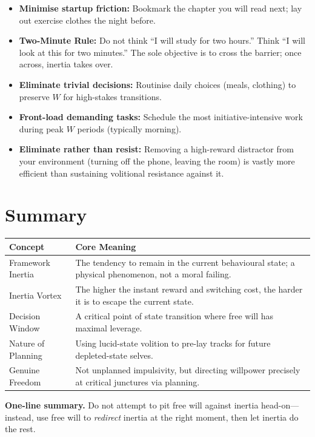 \begin{methodbox}[title={Method 2: Lower the Activation Barrier}]
\begin{itemize}[nosep]
  \item \textbf{Minimise startup friction:} Bookmark the chapter you will
        read next; lay out exercise clothes the night before.
  \item \textbf{Two-Minute Rule:} Do not think ``I will study for two
        hours.'' Think ``I will look at this for two minutes.'' The sole
        objective is to cross the barrier; once across, inertia takes over.
\end{itemize}
\end{methodbox}

\begin{methodbox}[title={Method 3: Conserve the Volitional Battery}]
\begin{itemize}[nosep]
  \item \textbf{Eliminate trivial decisions:} Routinise daily choices (meals,
        clothing) to preserve $W$ for high-stakes transitions.
  \item \textbf{Front-load demanding tasks:} Schedule the most
        initiative-intensive work during peak $W$ periods (typically morning).
  \item \textbf{Eliminate rather than resist:} Removing a high-reward
        distractor from your environment (turning off the phone, leaving the
        room) is vastly more efficient than sustaining volitional resistance
        against it.
\end{itemize}
\end{methodbox}

\section{Summary}\label{sec:summary}

\begin{center}
\renewcommand{\arraystretch}{1.4}
\begin{tabular}{@{}l p{}@{}}
\hline
\textbf{Concept} & \textbf{Core Meaning} \\
\hline
Framework Inertia &
  The tendency to remain in the current behavioural state; a physical
  phenomenon, not a moral failing. \\
Inertia Vortex &
  The higher the instant reward and switching cost, the harder it is to
  escape the current state. \\
Decision Window &
  A critical point of state transition where free will has maximal
  leverage. \\
Nature of Planning &
  Using lucid-state volition to pre-lay tracks for future depleted-state
  selves. \\
Genuine Freedom &
  Not unplanned impulsivity, but directing willpower precisely at critical
  junctures via planning. \\
\hline
\end{tabular}
\end{center}

\begin{insightbox}
\textbf{One-line summary.}
Do not attempt to pit free will against inertia head-on---instead, use free
will to \emph{redirect} inertia at the right moment, then let inertia do the
rest.
\end{insightbox}
